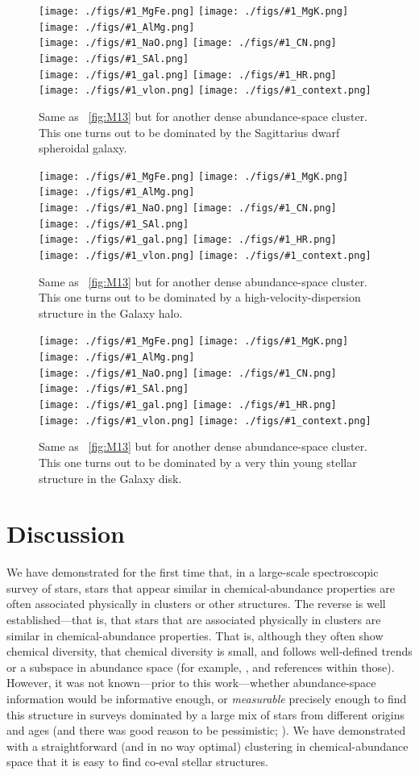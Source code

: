 \documentclass[12pt, letterpaper, preprint]{aastex}
\newcommand{\insanefigure}[1]{%
\texttt{[image: ./figs/\#1\_MgFe.png]}%
\texttt{[image: ./figs/\#1\_MgK.png]}%
\texttt{[image: ./figs/\#1\_AlMg.png]}\\
\texttt{[image: ./figs/\#1\_NaO.png]}%
\texttt{[image: ./figs/\#1\_CN.png]}%
\texttt{[image: ./figs/\#1\_SAl.png]}\\
\texttt{[image: ./figs/\#1\_gal.png]}%
\texttt{[image: ./figs/\#1\_HR.png]}\\
\texttt{[image: ./figs/\#1\_vlon.png]}%
\texttt{[image: ./figs/\#1\_context.png]}}
\begin{document}
\begin{figure}[!p]
\insanefigure{cluster_0256_0177}
\caption{Same as \figurename~\ref{fig:M13} but for another dense
  abundance-space cluster.
  This one turns out to be dominated by the Sagittarius dwarf spheroidal galaxy.\label{fig:Sgr}}
\end{figure}
\begin{figure}[!p]
\insanefigure{cluster_0256_0010}
\caption{Same as \figurename~\ref{fig:M13} but for another dense
  abundance-space cluster.
  This one turns out to be dominated by a high-velocity-dispersion
  structure in the Galaxy halo.\label{fig:halo}}
\end{figure}
\begin{figure}[!p]
\insanefigure{cluster_0256_0141}
\caption{Same as \figurename~\ref{fig:M13} but for another dense
  abundance-space cluster.
  This one turns out to be dominated by a very thin young stellar
  structure in the Galaxy disk.\label{fig:disk}}
\end{figure}

\clearpage
\section{Discussion}\label{sec:discussion}

We have demonstrated for the first time that, in a large-scale
spectroscopic survey of stars, stars that appear similar in
chemical-abundance properties are often associated physically in
clusters or other structures.
The reverse is well established---that is, that stars that are
associated physically in clusters are similar in chemical-abundance
properties.
That is, although they often show chemical diversity, that chemical
diversity is small, and follows well-defined trends or a subspace in
abundance space (for example, \citealt{gratton, meszaros, bovy},
and references within those).
However, it was not known---prior to this work---whether abundance-space information would be
informative enough, or \emph{measurable} precisely enough to find this
structure in surveys dominated by a large mix of stars from different
origins and ages (and there was good reason to be pessimistic;
\citealt{ting}).
We have demonstrated with a straightforward (and in no way optimal)
clustering in chemical-abundance space that it is easy to find co-eval
stellar structures.
\end{document}
